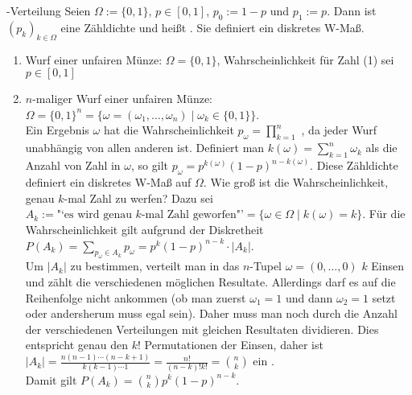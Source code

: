 \linie

\begin{Def}{-Verteilung}
    Seien $\Omega := \{0, 1\}$, $p \in [0, 1]$, $p_0 := 1 - p$ und $p_1 := p$.
    Dann ist $(p_k)_{k \in \Omega}$ eine Zähldichte und
    heißt .
    Sie definiert ein diskretes W-Maß.
\end{Def}

\begin{Bsp}
    \begin{enumerate}
        \item
        Wurf einer unfairen Münze: $\Omega = \{0, 1\}$,
        Wahrscheinlichkeit für Zahl (1) sei $p \in [0, 1]$
        
        \item
        $n$-maliger Wurf einer unfairen Münze: $\Omega = \{0, 1\}^n =
        \{\omega = (\omega_1, \dotsc, \omega_n) \;|\; \omega_k \in \{0, 1\}\}$.\\
        Ein Ergebnis $\omega$ hat die Wahrscheinlichkeit
        $p_\omega = \prod_{k=1}^n$
        ,
        da jeder Wurf unabhängig von allen anderen ist.
        Definiert man $k(\omega) = \sum_{k=1}^n \omega_k$ als die Anzahl von Zahl in $\omega$,
        so gilt $p_\omega = p^{k(\omega)} (1 - p)^{n - k(\omega)}$.
        Diese Zähldichte definiert ein diskretes W-Maß auf $\Omega$.
        Wie groß ist die Wahrscheinlichkeit, genau $k$-mal Zahl zu werfen?
        Dazu sei\\
        $A_k := \text{"`es wird genau } k\text{-mal Zahl geworfen"'} = 
        \{\omega \in \Omega \;|\; k(\omega) = k\}$.
        Für die Wahrscheinlichkeit gilt aufgrund der Diskretheit
        $P(A_k) = \sum_{p_\omega \in A_k} p_\omega = p^k (1 - p)^{n-k} \cdot |A_k|$.\\
        Um $|A_k|$ zu bestimmen, verteilt man in das $n$-Tupel $\omega = (0, \dotsc, 0)$ $k$
        Einsen und zählt die verschiedenen möglichen Resultate.
        Allerdings darf es auf die Reihenfolge nicht ankommen
        (ob man zuerst $\omega_1 = 1$ und dann $\omega_2 = 1$ setzt oder andersherum muss
        egal sein).
        Daher muss man noch durch die Anzahl der verschiedenen Verteilungen mit gleichen Resultaten
        dividieren.
        Dies entspricht genau den $k!$ Permutationen der Einsen, daher ist
        $|A_k| = \frac{n (n - 1) \dotsm (n - k + 1)}{k (k - 1) \dotsm 1} =
        \frac{n!}{(n - k)! k!} = \binom{n}{k}$ ein .\\
        Damit gilt $P(A_k) = \binom{n}{k} p^k (1 - p)^{n-k}$.
    \end{enumerate}
\end{Bsp}

